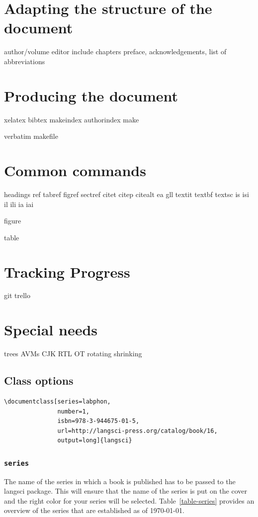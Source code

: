 \section{Adapting the structure of the document}
author/volume editor
include chapters
preface, acknowledgements, list of abbreviations

\section{Producing the document}
xelatex 
bibtex
makeindex
authorindex
make 

verbatim makefile

\section{Common commands}
headings
ref 
tabref
figref
sectref
citet citep citealt
ea gll 
textit textbf textsc
is isi il ili ia iai

figure

table 

\section{Tracking Progress}
git
trello

\section{Special needs}
trees
AVMs
CJK
RTL
OT
rotating
shrinking

 
\subsection{Class options}
 

\begin{verbatim}
\documentclass[series=labphon,
               number=1,
               isbn=978-3-944675-01-5,
               url=http://langsci-press.org/catalog/book/16,
               output=long]{langsci}            
\end{verbatim}
 
\subsubsection{\texttt{series}}

The name of the series in which a book is published has to be passed to the langsci package. This will ensure that the name of
the series is put on the cover and the right color for your series will be
selected. Table~\vref{table-series} provides an overview of the series that are established as of
\today.


